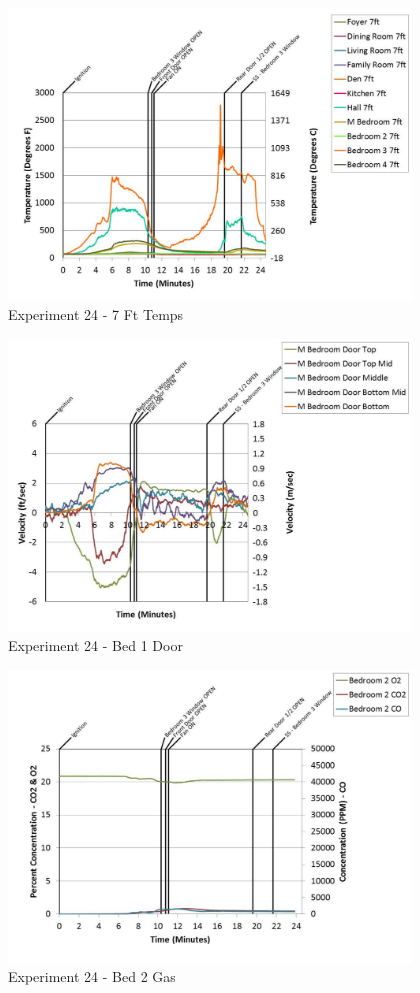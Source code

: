 \documentclass{article}
\begin{document}
\begin{appendices}
	\begin{figure}[h!]
		\centering
		\includegraphics[height=3.05in]{0_Images/Results_Charts/Exp_24_Charts/7FtTemps.pdf}
		\caption{Experiment 24 - 7 Ft Temps}
	\end{figure}
 
	\clearpage

	\begin{figure}[h!]
		\centering
		\includegraphics[height=3.05in]{0_Images/Results_Charts/Exp_24_Charts/Bed1Door.pdf}
		\caption{Experiment 24 - Bed 1 Door}
	\end{figure}
 

	\begin{figure}[h!]
		\centering
		\includegraphics[height=3.05in]{0_Images/Results_Charts/Exp_24_Charts/Bed2Gas.pdf}
		\caption{Experiment 24 - Bed 2 Gas}
	\end{figure}
 

\end{appendices}
\end{document}
